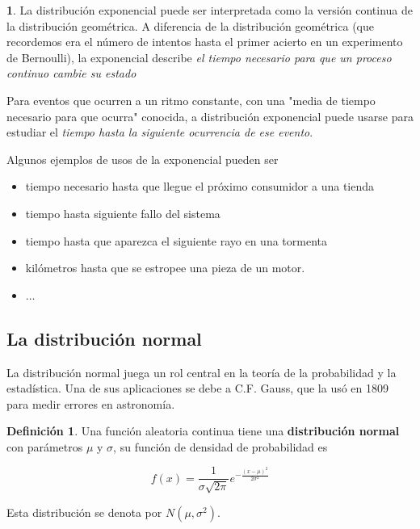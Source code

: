\documentclass[]{book}
\theoremstyle{plain}
\theoremstyle{definition}
\newtheorem{definition}[theorem]{Definición}
\theoremstyle{definition} %
\newcommand{\thistheoremname}{}
\newtheorem{genericthm}[theorem]{\thistheoremname}
\newenvironment{customdef}[1]
  {\renewcommand{\thistheoremname}{#1}%
   \begin{genericthm}}
  {\end{genericthm}}
\begin{document}
\begin{customdef}{Aplicaciones de la distribución exponencial}
  La distribución exponencial puede ser interpretada como la versión continua de la distribución geométrica. A diferencia de la 
  distribución geométrica (que recordemos era el número de intentos hasta el primer acierto en un experimento de Bernoulli), 
  la exponencial describe \emph{el tiempo necesario para que un proceso continuo cambie su estado}

  Para eventos que ocurren a un ritmo constante, con una "media de tiempo necesario para que ocurra" conocida, a distribución exponencial 
  puede usarse para estudiar el \emph{tiempo hasta la siguiente ocurrencia de ese evento}. 

  Algunos ejemplos de usos de la exponencial pueden ser 
  \begin{itemize}
    \item tiempo necesario hasta que llegue el próximo consumidor a una tienda
    \item tiempo hasta siguiente fallo del sistema
    \item tiempo hasta que aparezca el siguiente rayo en una tormenta
    \item kilómetros hasta que se estropee una pieza de un motor.
    \item $\ldots$
  \end{itemize}
\end{customdef}

\subsection{La distribución normal} 

La distribución normal juega un rol central en la teoría de la
probabilidad y la estadística. Una de sus aplicaciones se debe a C.F.
Gauss, que la usó en 1809 para medir errores en astronomía.

\begin{definition}
  
Una función aleatoria continua tiene una \textbf{distribución normal}
con parámetros \(\mu\) y \(\sigma\), su función de densidad de
probabilidad es

\begin{equation}\label{eq_nmusigma}
  f(x) = \frac{1}{\sigma \sqrt{2\pi}} e^{-\frac{(x-\mu)^2}{2\sigma^2}}
\end{equation}
 

Esta distribución se denota por \(N(\mu, \sigma^2)\).
\end{definition}
\end{document}
